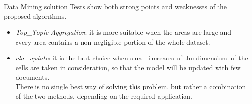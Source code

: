 \documentclass[final]{beamer}
\newlength{\onecolwid}
\newlength{\twocolwid}
\begin{document}
\begin{frame}[t]
\begin{columns}[t]
\begin{column}{\twocolwid}
\begin{columns}[t,totalwidth=\twocolwid]
\begin{column}{\onecolwid}\vspace{-.6in} %


\begin{block}{Data Mining solution}
Tests show both strong points and weaknesses of the proposed algorithms. \begin{itemize}
\item \emph{Top\_Topic Aggregation}: it is more suitable when the areas are large and every area contains a non negligible portion of the whole dataset.
\item \emph{lda\_update}: it is the best choice when small increases of the dimensions of the cells are taken in consideration, so that the model will be updated with few documents. \\[.6cm]

There is no single best way of solving this problem, but rather a combination of the two methods, depending on the required application. 
\end{itemize}    

\end{block}


\end{column} %

\end{columns} %


\begin{columns}[t,totalwidth=\twocolwid] %

\begin{column}{\onecolwid} %



\end{column}
\end{columns}
\end{column}
\end{columns}
\end{frame}
\end{document}

